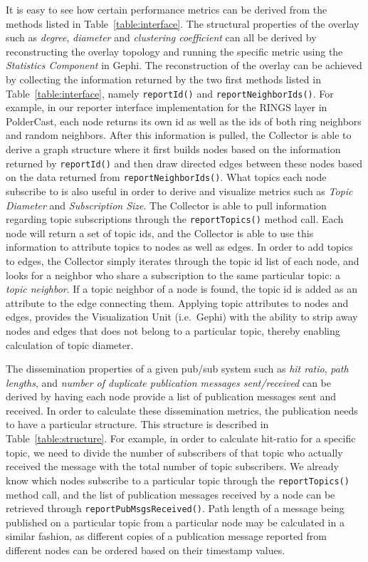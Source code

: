 

It is easy to see how certain performance metrics can be derived from
the methods listed in Table~\ref{table:interface}.  The structural
properties of the overlay such as \emph{degree}, \emph{diameter} and
\emph{clustering coefficient} can all be derived by reconstructing the
overlay topology and running the specific metric using the
\emph{Statistics Component} in Gephi. The reconstruction of the overlay
can be achieved  by collecting the information returned by the two first
methods listed in Table~\ref{table:interface}, namely
\texttt{reportId()} and \texttt{reportNeighborIds()}. For example, in
our reporter interface implementation for the RINGS layer in PolderCast,
each node returns its own id as well as the ids of both ring neighbors
and random neighbors. After this information is pulled, the Collector is
able to derive a graph structure where it first builds nodes based on
the information returned by \texttt{reportId()} and then draw directed
edges between these nodes based on the data returned from
\texttt{reportNeighborIds()}. What topics each node subscribe to is
also useful in order to derive and visualize metrics such as \emph{Topic
    Diameter} and \emph{Subscription Size}. The Collector is able to
pull information regarding topic subscriptions through the
\texttt{reportTopics()} method call. Each node will return a
set of topic ids, and the Collector is able to use this information to
attribute topics to nodes as well as edges.  In order to add topics
to edges, the Collector simply iterates through the topic id list of
each node, and looks for a neighbor who share a subscription to the same
particular topic: a \emph{topic neighbor}. If a topic neighbor of a node
is found, the topic id is added as an attribute to the edge connecting
them. Applying topic attributes to nodes and edges, provides the
Visualization Unit (i.e.\ Gephi) with the ability to strip away nodes
and edges that does not belong to a particular topic, thereby enabling
calculation of topic diameter.

The dissemination properties of a given pub/sub system such as
\emph{hit ratio}, \emph{path lengths}, and \emph{number of duplicate publication
messages sent/received} can be derived by having each node provide a list of
publication messages sent and received. In order to calculate these
dissemination metrics, the publication needs to have a particular
structure. This structure is described in Table~\ref{table:structure}.
For example, in order to calculate hit-ratio for a specific topic, we
need to divide the number of subscribers of that topic who actually
received the message with the total number of topic subscribers. We
already know which nodes subscribe to a particular topic through the
\texttt{reportTopics()} method call, and the list of publication
messages received by a node can be retrieved through
\texttt{reportPubMsgsReceived()}. Path length of a
message being published on a particular topic from a particular node may
be calculated in a similar fashion, as different copies of a publication message reported from
different nodes can be ordered based on their timestamp values.

